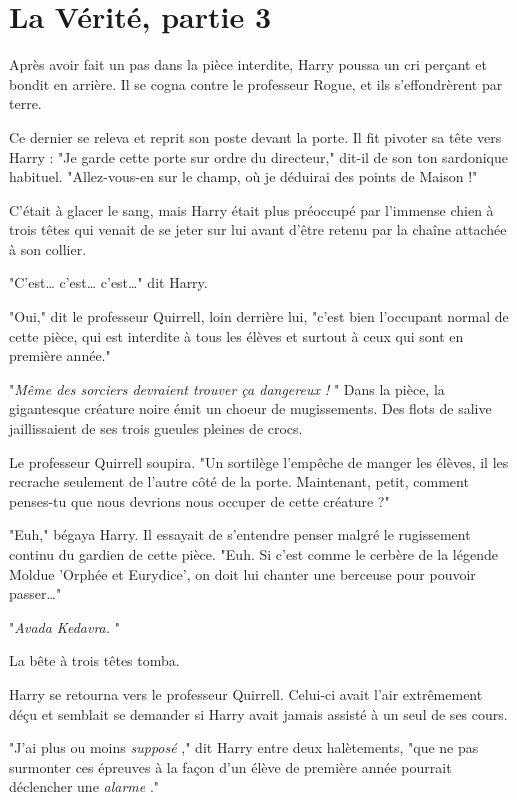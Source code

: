 
\chapter{La Vérité, partie 3}

Après avoir fait un pas dans la pièce interdite, Harry poussa un cri perçant et bondit en arrière. Il se cogna contre le professeur Rogue, et ils s'effondrèrent par terre.

Ce dernier se releva et reprit son poste devant la porte. Il fit pivoter sa tête vers Harry : "Je garde cette porte sur ordre du directeur," dit-il de son ton sardonique habituel. "Allez-vous-en sur le champ, où je déduirai des points de Maison !"

C'était à glacer le sang, mais Harry était plus préoccupé par l'immense chien à trois têtes qui venait de se jeter sur lui avant d'être retenu par la chaîne attachée à son collier.

"C'est… c'est… c'est…" dit Harry.

"Oui," dit le professeur Quirrell, loin derrière lui, "c'est bien l'occupant normal de cette pièce, qui est interdite à tous les élèves et surtout à ceux qui sont en première année."

"\emph{Même des sorciers devraient trouver ça dangereux !} " Dans la pièce, la gigantesque créature noire émit un choeur de mugissements. Des flots de salive jaillissaient de ses trois gueules pleines de crocs.

Le professeur Quirrell soupira. "Un sortilège l'empêche de manger les élèves, il les recrache seulement de l'autre côté de la porte. Maintenant, petit, comment penses-tu que nous devrions nous occuper de cette créature ?"

"Euh," bégaya Harry. Il essayait de s'entendre penser malgré le rugissement continu du gardien de cette pièce. "Euh. Si c'est comme le cerbère de la légende Moldue 'Orphée et Eurydice', on doit lui chanter une berceuse pour pouvoir passer…"

"\emph{Avada Kedavra.} "

La bête à trois têtes tomba.

Harry se retourna vers le professeur Quirrell. Celui-ci avait l'air extrêmement déçu et semblait se demander si Harry avait jamais assisté à un seul de ses cours.

"J'ai plus ou moins \emph{supposé} ," dit Harry entre deux halètements, "que ne pas surmonter ces épreuves à la façon d'un élève de première année pourrait déclencher une \emph{alarme} ."

